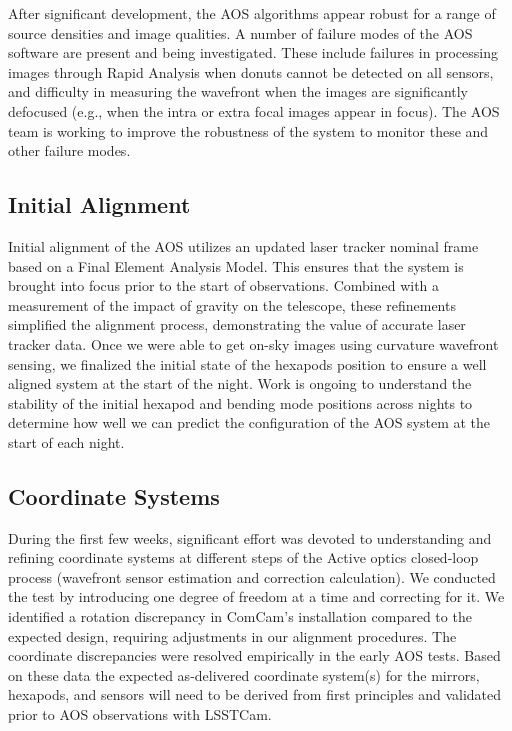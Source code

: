 After significant development, the AOS algorithms appear robust for a range of source densities and image qualities. A number of failure modes of the AOS software are present and being investigated. These include failures in processing images through Rapid Analysis when donuts cannot be detected on all sensors, and difficulty in measuring the wavefront when the images are significantly defocused (e.g., when the intra or extra focal images appear in focus). The AOS team is working to improve the robustness of the system to monitor these and other failure modes.


\subsection{Initial Alignment}
Initial alignment of the AOS utilizes an updated laser tracker nominal frame based on a Final Element Analysis Model.  This ensures that the system is brought into focus prior to the start of observations.  Combined with a measurement of the impact of gravity on the telescope, these refinements simplified the alignment process, demonstrating the value of accurate laser tracker data. Once we were able to get on-sky images using curvature wavefront sensing, we finalized the initial state of the hexapods position to ensure a well aligned system at the start of the night. Work is ongoing to understand the stability of the initial hexapod and bending mode positions across nights to determine how well we can predict the  configuration of the AOS system at the start of each night. 


\subsection{Coordinate Systems}
During the first few weeks, significant effort was devoted to understanding and refining coordinate systems at different steps of the Active optics closed-loop process (wavefront sensor estimation and correction calculation). We conducted the test by introducing one degree of freedom at a time and correcting for it. We identified a rotation discrepancy in ComCam's installation compared to the expected design, requiring 
adjustments in our alignment procedures. The coordinate discrepancies were resolved empirically in the early AOS tests. Based on these data the expected as-delivered coordinate system(s) for the mirrors, hexapods, and sensors will need to be derived from first principles and validated prior to AOS observations with LSSTCam.


